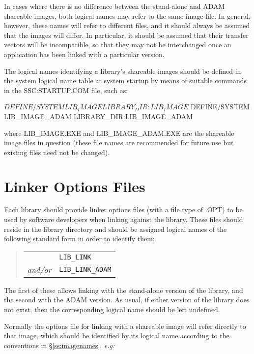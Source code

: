 \documentclass[noabs,11pt,nolof]{starlink}
\begin{document}
In cases where there is no difference between the stand-alone and ADAM
shareable images, both logical names may refer to the same image file.
In general, however, these names will refer to different files, and it
should always be assumed that the images will differ.
In particular, it should be assumed that their transfer vectors will be
incompatible, so that they may not be interchanged once an application has
been linked with a particular version.

The logical names identifying a library's shareable images should be defined
in the system logical name table at system startup by means of suitable
commands in the SSC:STARTUP.COM file, such as:

\begin{terminalv}
$ DEFINE/SYSTEM LIB_IMAGE      LIBRARY_DIR:LIB_IMAGE
$ DEFINE/SYSTEM LIB_IMAGE_ADAM LIBRARY_DIR:LIB_IMAGE_ADAM
\end{terminalv}

where LIB\_IMAGE.EXE and LIB\_IMAGE\_ADAM.EXE are the shareable image files
in question (these file names are recommended for future use but existing
files need not be changed).


\section{Linker Options Files}

Each library should provide linker options files (with a file type of .OPT) to
be used by software developers when linking against the library.
These files should reside in the library directory and should be assigned
logical names of the following standard form in order to identify them:

\begin{quote}
\begin{tabular}{rl}
& \texttt{LIB\_LINK} \\
\emph{and/or} & \texttt{LIB\_LINK\_ADAM}
\end{tabular}
\end{quote}

The first of these allows linking with the stand-alone version of the
library, and the second with the ADAM version.
As usual, if either version of the library does not exist, then the
corresponding logical name should be left undefined.

Normally the options file for linking with a shareable image will refer
directly to that image, which should be identified by its logical name
according to the conventions in \S\ref{ss:imagenames}, \emph{e.g:}
\end{document}

